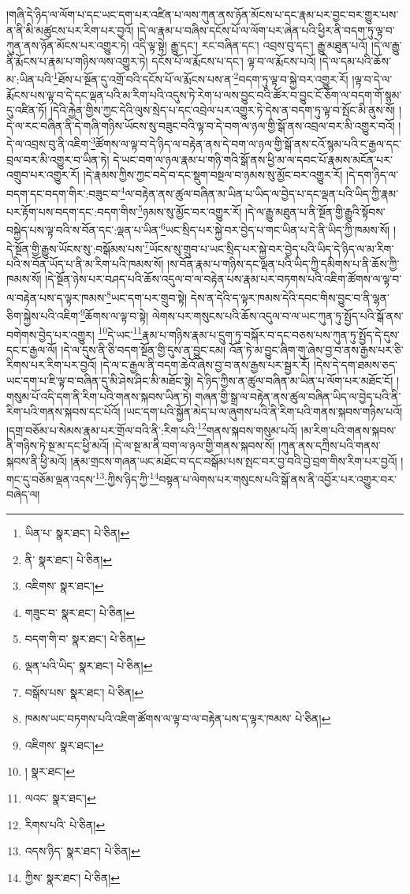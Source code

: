 །གཞི་དེ་ཉིད་ལ་ལོག་པ་དང་ཡང་དག་པར་འཛིན་པ་ལས་ཀུན་ནས་ཉོན་མོངས་པ་དང་རྣམ་པར་བྱང་བར་གྱུར་པས་ན་ནི་མི་མཚུངས་པར་རིག་པར་བྱའོ། །དེ་ལ་རྣམ་པ་བཞིས་དངོས་པོ་ལ་ལོག་པར་ཞེན་པའི་ཕྱིར་ནི་བདག་ཏུ་ལྟ་བ་ཀུན་ནས་ཉོན་མོངས་པར་འགྱུར་ཏེ། འདི་ལྟ་སྟེ། རྒྱུ་དང་། རང་བཞིན་དང་། འབྲས་བུ་དང་། རྒྱུ་མཐུན་པའོ། །དེ་ལ་རྒྱུ་ནི་རྨོངས་པ་རྣམ་པ་གཉིས་ལས་འགྱུར་ཏེ། དངོས་པོ་ལ་རྨོངས་པ་དང་། ལྟ་བ་ལ་རྨོངས་པའོ། །དེ་ལ་དམ་པའི་ཆོས་མ་:ཡིན་པའི་\footnote{ཡིན་པ་  སྣར་ཐང་།  པེ་ཅིན། }ཐོས་པ་སྔོན་དུ་འགྲོ་བའི་དངོས་པོ་ལ་རྨོངས་པས་ན་\footnote{ནི་  སྣར་ཐང་།  པེ་ཅིན། }བདག་ཏུ་ལྟ་བ་སྐྱེ་བར་འགྱུར་རོ། །ལྟ་བ་དེ་ལ་རྨོངས་པས་ལྟ་བ་དེ་དང་ལྡན་པའི་མ་རིག་པའི་འདུས་ཏེ་རེག་པ་ལས་བྱུང་བའི་ཚོར་བ་བྱུང་ངོ་ཅོག་ལ་བདག་གོ་སྙམ་དུ་འཛིན་ཏོ། །དེའི་རྐྱེན་གྱིས་ཀྱང་དེའི་ལུས་སྲེད་པ་དང་འབྲེལ་པར་འགྱུར་ཏེ་དེས་ན་བདག་ཏུ་ལྟ་བ་སྤོང་མི་ནུས་སོ། །དེ་ལ་རང་བཞིན་ནི་དེ་གཞི་གཉིས་ཡོངས་སུ་བཟུང་བའི་ལྟ་བ་དེ་བག་ལ་ཉལ་གྱི་སྒོ་ནས་འབྲལ་བར་མི་འགྱུར་བའོ། །དེ་ལ་འབྲས་བུ་ནི་འཇིག་\footnote{འཇིགས་  སྣར་ཐང་། }ཚོགས་ལ་ལྟ་བ་དེ་ཉིད་ལ་བརྟེན་ནས་དེ་བག་ལ་ཉལ་གྱི་སྒོ་ནས་ངའོ་སྙམ་པའི་ང་རྒྱལ་དང་བྲལ་བར་མི་འགྱུར་བ་ཡིན་ཏེ། དེ་ཡང་བག་ལ་ཉལ་རྣམ་པ་གཉི་གའི་སྒོ་ནས་ཕྱི་མ་ལ་དབང་པོ་རྣམས་མངོན་པར་འགྲུབ་པར་འགྱུར་རོ། །དེ་རྣམས་ཀྱིས་ཀྱང་བདེ་བ་དང་སྡུག་བསྔལ་བ་ཉམས་སུ་མྱོང་བར་འགྱུར་རོ། །དེ་དག་ཉིད་ལ་བདག་དང་བདག་གིར་:བཟུང་བ་\footnote{གཟུང་བ་  སྣར་ཐང་།  པེ་ཅིན། }ལ་བརྟེན་ནས་ཚུལ་བཞིན་མ་ཡིན་པ་ཡིད་ལ་བྱེད་པ་དང་ལྡན་པའི་ཡིད་ཀྱི་རྣམ་པར་རྟོག་པས་བདག་དང་:བདག་གིས་\footnote{བདག་གི་བ་  སྣར་ཐང་།  པེ་ཅིན། }ཉམས་སུ་མྱོང་བར་འགྱུར་རོ། །དེ་ལ་རྒྱུ་མཐུན་པ་ནི་སྔོན་གྱི་རྒྱུའི་སྟོབས་བསྐྱེད་པས་ལྟ་བའི་ས་བོན་དང་:ལྡན་པ་ཡིན་\footnote{ལྡན་པའི་ཡིད་  སྣར་ཐང་།  པེ་ཅིན། }ཡང་སྲིད་པར་སྐྱེ་བར་བྱེད་པ་གང་ཡིན་པ་དེ་ནི་ཡིད་ཀྱི་ཁམས་སོ། །དེ་སྔོན་གྱི་རྒྱུས་ཡོངས་སུ་:བསྒོམས་པས་\footnote{བསྒོས་པས་  སྣར་ཐང་།  པེ་ཅིན། }ཡོངས་སུ་གྲུབ་པ་ཡང་སྲིད་པར་སྐྱེ་བར་བྱེད་པའི་ཡིད་དེ་ཉིད་ལ་མ་རིག་པའི་ས་བོན་ཡོད་པ་ནི་མ་རིག་པའི་ཁམས་སོ། །ས་བོན་རྣམ་པ་གཉིས་དང་ལྡན་པའི་ཡིད་ཀྱི་དམིགས་པ་ནི་ཆོས་ཀྱི་ཁམས་སོ། །དེ་སྔོན་ཉེས་པར་བཤད་པའི་ཆོས་འདུལ་བ་ལ་བརྟེན་པས་རྣམ་པར་བཏགས་པའི་འཇིག་ཚོགས་ལ་ལྟ་བ་ལ་བརྟེན་པས་ད་ལྟར་ཁམས་\footnote{ཁམས་ཡང་བཏགས་པའི་འཇིག་ཚོགས་ལ་ལྟ་བ་ལ་བརྟེན་པས་ད་ལྟར་ཁམས་  པེ་ཅིན། }ཡང་དག་པར་གྲུབ་སྟེ། དེས་ན་དེའི་ད་ལྟར་ཁམས་དེའི་དབང་གིས་བྱུང་བ་ནི་ལྷན་ཅིག་སྐྱེས་པའི་འཇིག་\footnote{འཇིགས་  སྣར་ཐང་། }ཆོགས་ལ་ལྟ་བ་སྟེ། ལེགས་པར་གསུངས་པའི་ཆོས་འདུལ་བ་ལ་ཡང་ཀུན་ཏུ་སྤྱོད་པའི་སྒོ་ནས་བགེགས་བྱེད་པར་འགྱུར། \footnote{།  སྣར་ཐང་། }དེ་ཡང་\footnote{ལའང་  སྣར་ཐང་། }རྣམ་པ་གཉིས་རྣམ་པ་དྲུག་ཏུ་བསྐོར་བ་དང་བཅས་པས་ཀུན་ཏུ་སྤྱོད་དེ་དུས་དང་ང་རྒྱལ་ལོ། །དེ་ལ་དུས་ནི་ཅི་བདག་སྔོན་གྱི་དུས་ན་བྱུང་ངམ། འོན་ཏེ་མ་བྱུང་ཞིག་གུ་ཞེས་བྱ་བ་ནས་རྒྱས་པར་ཅི་རིགས་པར་རིག་པར་བྱའོ། །དེ་ལ་ང་རྒྱལ་ནི་བདག་ཆེའོ་ཞེས་བྱ་བ་ནས་རྒྱས་པར་སྦྱར་རོ། །དེས་དེ་དག་ཐམས་ཅད་ཡང་དག་པ་ཇི་ལྟ་བ་བཞིན་དུ་མི་ཤེས་ཤིང་མི་མཐོང་སྟེ། དེ་ཉིད་ཀྱིས་ན་ཚུལ་བཞིན་མ་ཡིན་པ་ལོག་པར་མཐོང་ངོ། །གསུམ་པོ་འདི་དག་ནི་རིག་པའི་གནས་སྐབས་ཡིན་ཏེ། གཞན་གྱི་སྒྲ་ལ་བརྟེན་ནས་ཚུལ་བཞིན་ཡིད་ལ་བྱེད་པའི་ནི་རིག་པའི་གནས་སྐབས་དང་པོའོ། །ཡང་དག་པའི་སྐྱོན་མེད་པ་ལ་ཞུགས་པའི་ནི་རིག་པའི་གནས་སྐབས་གཉིས་པའོ། །དགྲ་བཅོམ་པ་སེམས་རྣམ་པར་གྲོལ་བའི་ནི་:རིག་པའི་\footnote{རིགས་པའི་  པེ་ཅིན། }གནས་སྐབས་གསུམ་པའོ། །མ་རིག་པའི་གནས་སྐབས་ནི་གཉིས་ཏེ་སྔ་མ་དང་ཕྱི་མའོ། །དེ་ལ་སྔ་མ་ནི་བག་ལ་ཉལ་གྱི་གནས་སྐབས་སོ། །ཀུན་ནས་དཀྲིས་པའི་གནས་སྐབས་ནི་ཕྱི་མའོ། །རྣམ་གྲངས་གཞན་ཡང་མཐོང་བ་དང་བསྒོམ་པས་སྤང་བར་བྱ་བའི་བྱེ་བྲག་གིས་རིག་པར་བྱའོ། །གང་དུ་བཅོམ་ལྡན་འདས་\footnote{འདས་ཉིད་  སྣར་ཐང་།  པེ་ཅིན། }:ཀྱིས་ཉིད་ཀྱི་\footnote{ཀྱིས་  སྣར་ཐང་།  པེ་ཅིན། }བསྟན་པ་ལེགས་པར་གསུངས་པའི་སྒོ་ནས་ནི་འབྱོར་པར་འགྱུར་བར་བཞེད་ལ། 